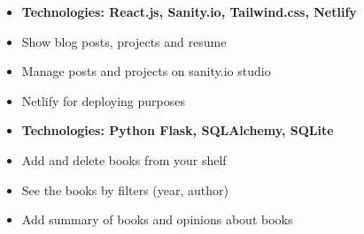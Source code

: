 \documentclass[10pt,a4paper]{altacv}
\begin{document}
\divider

\begin{itemize}
\item \textbf{Technologies: React.js, Sanity.io, Tailwind.css, Netlify}
\item Show blog posts, projects and resume
\item Manage posts and projects on sanity.io studio
\item Netlify for deploying purposes
\end{itemize}

\divider

\begin{itemize}
\item \textbf{Technologies: Python Flask, SQLAlchemy, SQLite}
\item Add and delete books from your shelf
\item See the books by filters (year, author)
\item Add summary of books and opinions about books
\end{itemize}

\divider
\end{document}
